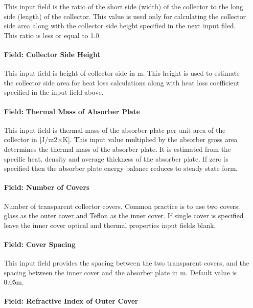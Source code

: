 This input field is the ratio of the short side (width) of the collector to the long side (length) of the collector. This value is used only for calculating the collector side area along with the collector side height specified in the next input filed. This ratio is less or equal to 1.0.

\paragraph{Field: Collector Side Height}\label{field-collector-side-height}

This input field is height of collector side in m. This height is used to estimate the collector side area for heat loss calculations along with heat loss coefficient specified in the input field above.

\paragraph{Field: Thermal Mass of Absorber Plate}\label{field-thermal-mass-of-absorber-plate}

This input field is thermal-mass of the absorber plate per unit area of the collector in {[}J/m2×K{]}. This input value multiplied by the absorber gross area determines the thermal mass of the absorber plate. It is estimated from the specific heat, density and average thickness of the absorber plate. If zero is specified then the absorber plate energy balance reduces to steady state form.

\paragraph{Field: Number of Covers}\label{field-number-of-covers}

Number of transparent collector covers. Common practice is to use two covers: glass as the outer cover and Teflon as the inner cover. If single cover is specified leave the inner cover optical and thermal properties input fields blank.

\paragraph{Field: Cover Spacing}\label{field-cover-spacing}

This input field provides the spacing between the two transparent covers, and the spacing between the inner cover and the absorber plate in m. Default value is 0.05m.

\paragraph{Field: Refractive Index of Outer Cover}\label{field-refractive-index-of-outer-cover}

